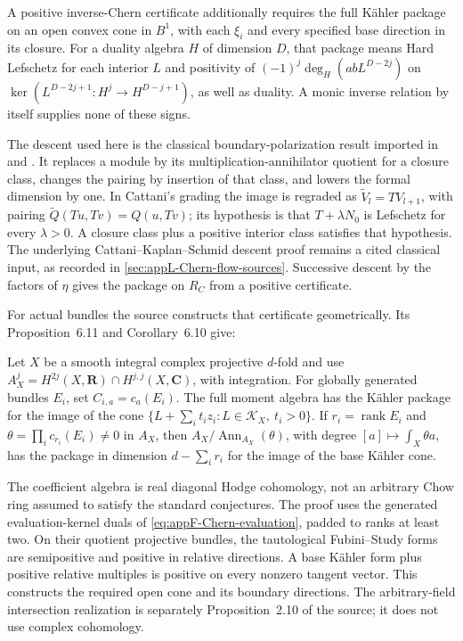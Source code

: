 A positive inverse-Chern certificate additionally requires the
full K\"ahler package on an open convex cone in $B^1$, with each
$\xi_i$ and every specified base direction in its closure.
For a duality algebra $H$ of dimension $D$, that package means
Hard Lefschetz for each interior $L$ and positivity of
$(-1)^j\deg_H(abL^{D-2j})$ on
$\ker(L^{D-2j+1}:H^j\to H^{D-j+1})$, as well as duality.
A monic inverse relation by itself supplies none of these signs.

The descent used here is the classical boundary-polarization
result imported in \cite[Lemma~4.6]{AminiHuhLarson25DecompositionV1}
and \cite[Theorem~3.2]{Cattani08MixedLefschetzV2}.
It replaces a module by its multiplication-annihilator quotient
for a closure class, changes the pairing by insertion of that class,
and lowers the formal dimension by one. In Cattani's grading
the image is regraded as $\widetilde V_l=T V_{l+1}$, with pairing
$\widetilde Q(Tu,Tv)=Q(u,Tv)$; its hypothesis is that
$T+\lambda N_0$ is Lefschetz for every $\lambda>0$.
A closure class plus a positive interior class satisfies that
hypothesis. The underlying Cattani--Kaplan--Schmid descent proof
remains a cited classical input, as recorded in
\cref{sec:appL-Chern-flow-sources}.
Successive descent by the factors of $\eta$ gives the package
on $R_C$ from a positive certificate.

For actual bundles the source constructs that certificate
geometrically. Its Proposition~6.11 and Corollary~6.10 give:
\begin{theorem}
\label{thm:appF-geometric-Chern-moments}
Let $X$ be a smooth integral complex projective $d$-fold and use
$A_X^j=H^{2j}(X,\mathbf R)\cap H^{j,j}(X,\mathbf C)$,
with integration. For globally generated bundles $E_i$, set
$C_{i,a}=c_a(E_i)$. The full moment algebra has the K\"ahler
package for the image of the cone
$\{L+\sum_i t_i z_i:L\in\mathcal K_X,\ t_i>0\}$.
If $r_i=\operatorname{rank}E_i$ and
$\theta=\prod_i c_{r_i}(E_i)\ne0$ in $A_X$, then
$A_X/\operatorname{Ann}_{A_X}(\theta)$, with degree
$[a]\mapsto\int_X\theta a$, has the package in dimension
$d-\sum_i r_i$ for the image of the base K\"ahler cone.
\end{theorem}

The coefficient algebra is real diagonal Hodge cohomology,
not an arbitrary Chow ring assumed to satisfy the standard
conjectures. The proof uses the generated evaluation-kernel duals
of \eqref{eq:appF-Chern-evaluation}, padded to ranks at least two.
On their quotient projective bundles, the tautological
Fubini--Study forms are semipositive and positive in relative
directions. A base K\"ahler form plus positive relative multiples
is positive on every nonzero tangent vector. This constructs the
required open cone and its boundary directions.
The arbitrary-field intersection realization is separately
Proposition~2.10 of the source; it does not use complex cohomology.

